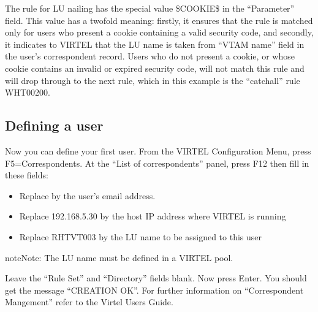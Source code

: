\documentclass[letterpaper,10pt,english]{sphinxmanual}
\begin{document}
\sphinxAtStartPar
{}

\sphinxAtStartPar
{}

\sphinxAtStartPar
The rule for LU nailing has the special value \$COOKIE\$ in the “Parameter” field.  This value has a two\sphinxhyphen{}fold meaning: firstly, it ensures that the rule is matched only for users who present a cookie containing a valid security code, and secondly, it indicates to VIRTEL that the LU name is taken from “VTAM name” field in the user’s correspondent record.
Users who do not present a cookie, or whose cookie contains an invalid or expired security code, will not match this rule and will drop through to the next rule, which in this example is the “catch\sphinxhyphen{}all” rule WHT00200.


\subsection{Defining a user}
\label{\detokenize{connectivity_guide:defining-a-user}}
\sphinxAtStartPar
Now you can define your first user.  From the VIRTEL Configuration Menu, press F5=Correspondents.  At the “List of correspondents” panel, press F12 then fill in these fields:

\sphinxAtStartPar
{}

\sphinxAtStartPar
{}
\begin{itemize}
\item {} 
\sphinxAtStartPar
Replace  by the user’s e\sphinxhyphen{}mail address.

\item {} 
\sphinxAtStartPar
Replace 192.168.5.30 by the host IP address where VIRTEL is running

\item {} 
\sphinxAtStartPar
Replace RHTVT003 by the LU name to be assigned to this user

\end{itemize}

\begin{sphinxadmonition}{note}{Note:}
\sphinxAtStartPar
The LU name must be defined in a VIRTEL pool.
\end{sphinxadmonition}

\sphinxAtStartPar
Leave the “Rule Set” and “Directory” fields blank. Now press Enter. You should get the message “CREATION OK”. For further information on “Correspondent Mangement” refer to the Virtel Users Guide.
\end{document}
